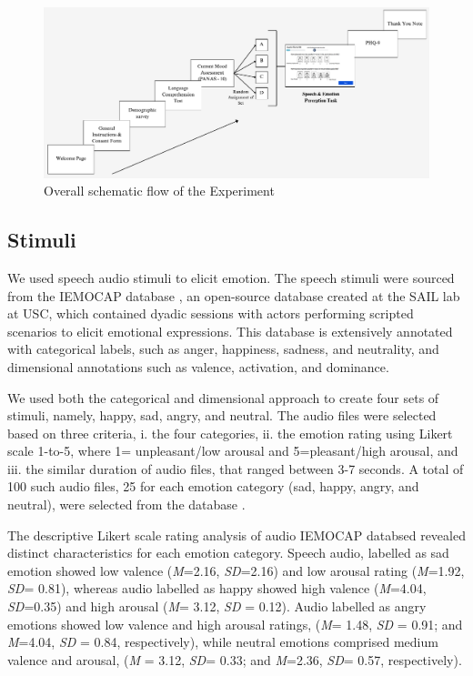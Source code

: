 \documentclass{Interspeech2024}
\begin{document}
\begin{figure}[t!] %
  \centering
  \includegraphics[width=\textwidth]{INTERSPEECH_flow_diag_2.pdf}
  \caption{Overall schematic flow of the Experiment  }
  \label{fig:your_label}
\end{figure}

\subsection{Stimuli } 

We used speech audio stimuli to elicit emotion. The speech stimuli were sourced from the IEMOCAP database \cite{Busso2008}, an open-source database created at the SAIL lab at USC, which contained dyadic sessions with actors performing scripted scenarios to elicit emotional expressions. This database is extensively annotated with categorical labels, such as anger, happiness, sadness, and neutrality, and dimensional annotations such as valence, activation, and dominance. 

We used both the categorical and dimensional approach to create four sets of stimuli, namely, happy, sad, angry, and neutral. The audio files were selected based on three criteria, i. the four categories, ii. the emotion rating using Likert scale 1-to-5, where 1= unpleasant/low arousal and 5=pleasant/high arousal, and iii. the similar duration of audio files, that ranged between 3-7 seconds. A total of 100 such audio files, 25 for each emotion category (sad, happy, angry, and neutral), were selected from the database \cite{Busso2008}. 

The descriptive Likert scale rating analysis of audio IEMOCAP databsed \cite{Busso2008} revealed distinct characteristics for each emotion category. Speech audio, labelled as sad emotion showed low valence (\textit{M}=2.16, \textit{SD}=2.16) and low arousal rating (\textit{M}=1.92, \textit{SD}= 0.81), whereas audio labelled as happy showed high valence (\textit{M}=4.04, \textit{SD}=0.35) and high arousal (\textit{M}= 3.12, \textit{SD} = 0.12). Audio labelled as angry emotions showed low valence and high arousal ratings, (\textit{M}= 1.48, \textit{SD} = 0.91; and \textit{M}=4.04, \textit{SD} = 0.84, respectively), while neutral emotions comprised medium valence and arousal, (\textit{M} = 3.12, \textit{SD}= 0.33; and \textit{M}=2.36, \textit{SD}= 0.57, respectively).  
\end{document}
